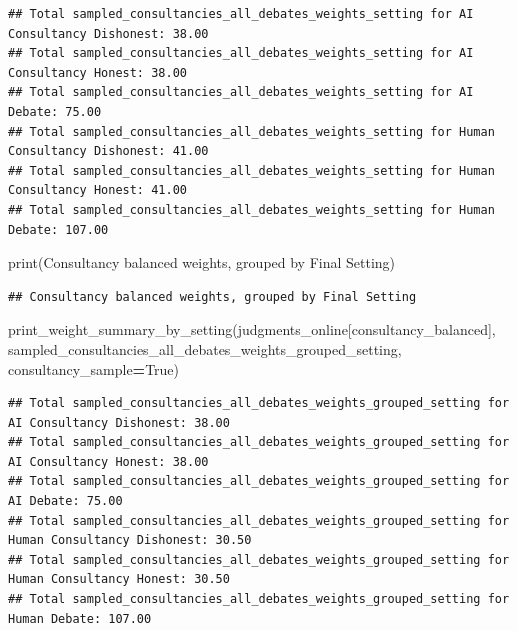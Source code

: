 \documentclass[
]{article}
\newenvironment{Shaded}{\begin{snugshade}}{\end{snugshade}}
\newcommand{\BuiltInTok}[1]{#1}
\newcommand{\NormalTok}[1]{#1}
\newcommand{\OperatorTok}[1]{\textcolor[rgb]{0.81,0.36,0.00}{\textbf{#1}}}
\newcommand{\StringTok}[1]{\textcolor[rgb]{0.31,0.60,0.02}{#1}}
\newcommand{\VariableTok}[1]{\textcolor[rgb]{0.00,0.00,0.00}{#1}}
\begin{document}
\begin{verbatim}
## Total sampled_consultancies_all_debates_weights_setting for AI Consultancy Dishonest: 38.00
## Total sampled_consultancies_all_debates_weights_setting for AI Consultancy Honest: 38.00
## Total sampled_consultancies_all_debates_weights_setting for AI Debate: 75.00
## Total sampled_consultancies_all_debates_weights_setting for Human Consultancy Dishonest: 41.00
## Total sampled_consultancies_all_debates_weights_setting for Human Consultancy Honest: 41.00
## Total sampled_consultancies_all_debates_weights_setting for Human Debate: 107.00
\end{verbatim}

\begin{Shaded}
\begin{Highlighting}[]
\BuiltInTok{print}\NormalTok{(}\StringTok{\textquotesingle{}Consultancy balanced weights, grouped by Final Setting\textquotesingle{}}\NormalTok{)}
\end{Highlighting}
\end{Shaded}

\begin{verbatim}
## Consultancy balanced weights, grouped by Final Setting
\end{verbatim}

\begin{Shaded}
\begin{Highlighting}[]
\NormalTok{print\_weight\_summary\_by\_setting(judgments\_online[consultancy\_balanced], }\StringTok{\textquotesingle{}sampled\_consultancies\_all\_debates\_weights\_grouped\_setting\textquotesingle{}}\NormalTok{, consultancy\_sample}\OperatorTok{=}\VariableTok{True}\NormalTok{)}
\end{Highlighting}
\end{Shaded}

\begin{verbatim}
## Total sampled_consultancies_all_debates_weights_grouped_setting for AI Consultancy Dishonest: 38.00
## Total sampled_consultancies_all_debates_weights_grouped_setting for AI Consultancy Honest: 38.00
## Total sampled_consultancies_all_debates_weights_grouped_setting for AI Debate: 75.00
## Total sampled_consultancies_all_debates_weights_grouped_setting for Human Consultancy Dishonest: 30.50
## Total sampled_consultancies_all_debates_weights_grouped_setting for Human Consultancy Honest: 30.50
## Total sampled_consultancies_all_debates_weights_grouped_setting for Human Debate: 107.00
\end{verbatim}
\end{document}

